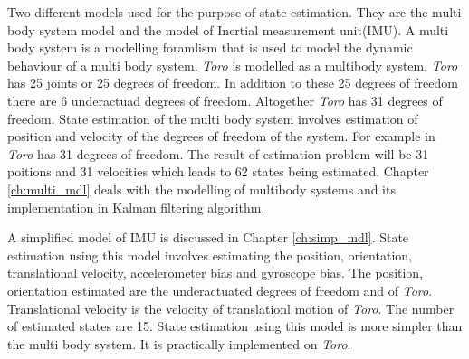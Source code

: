 \begin{itemize}
    Two different models used for the purpose of state estimation. They are the multi body system model and the model of Inertial measurement unit(IMU). A multi body system is a modelling foramlism that is used to model the dynamic behaviour of a multi body system. \emph{Toro} is modelled as a multibody system. \emph{Toro} has 25 joints or 25 degrees of freedom. In addition to these 25 degrees of freedom there are 6 underactuad degrees of freedom. Altogether \emph{Toro} has 31 degrees of freedom. State estimation of the multi body system involves estimation of position and velocity of the degrees of freedom of the system. For example in \emph{Toro} has 31 degrees of freedom. The result of estimation problem will be 31 poitions and 31 velocities which leads to 62 states being estimated. Chapter \ref{ch:multi_mdl} deals with the modelling of multibody systems and its implementation in Kalman filtering algorithm. 
    
    A simplified model of IMU is discussed in Chapter \ref{ch:simp_mdl}. State estimation using this model involves estimating the position, orientation, translational velocity, accelerometer bias and gyroscope bias. The position, orientation estimated are the underactuated degrees of freedom and of \emph{Toro}. Translational velocity is the velocity of translationl motion of \emph{Toro}. The number of estimated states are 15. State estimation using this model is more simpler than the multi body system. It is practically implemented on \emph{Toro}.
\end{itemize}
